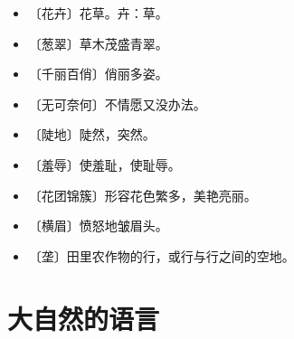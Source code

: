 \documentclass[12pt,UTF-8,openany]{ctexbook}
\begin{document}
\begin{itemize}
    \setlength\itemsep{-0.2em}
    \item 〔花卉〕花草。卉：草。
    \item 〔葱翠〕草木茂盛青翠。
    \item 〔千丽百俏〕俏丽多姿。
    \item 〔无可奈何〕不情愿又没办法。
    \item 〔陡地〕陡然，突然。
    \item 〔羞辱〕使羞耻，使耻辱。
    \item 〔花团锦簇〕形容花色繁多，美艳亮丽。
    \item 〔横眉〕愤怒地皱眉头。
    \item 〔垄〕田里农作物的行，或行与行之间的空地。
\end{itemize}

\chapter{大自然的语言}
\end{document}
